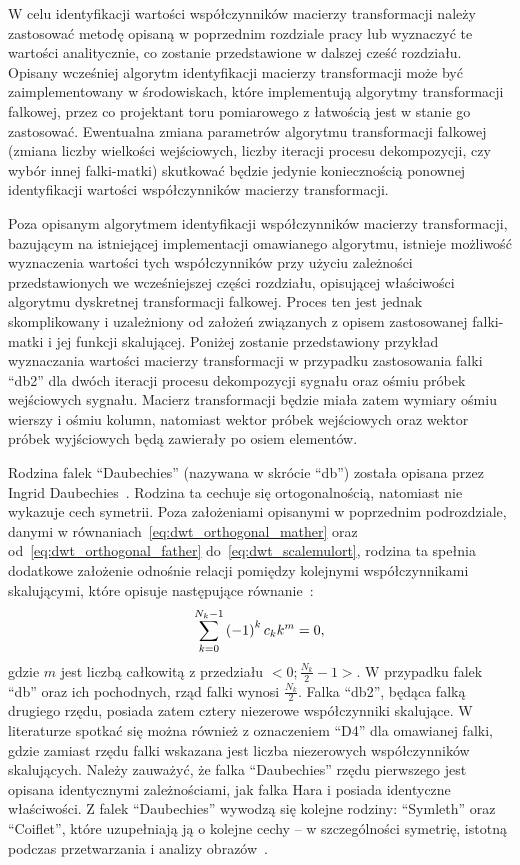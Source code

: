 W celu identyfikacji wartości współczynników macierzy transformacji należy zastosować metodę opisaną w poprzednim rozdziale pracy lub wyznaczyć te wartości analitycznie, co zostanie przedstawione w dalszej cześć rozdziału. Opisany wcześniej algorytm identyfikacji macierzy transformacji może być zaimplementowany w środowiskach, które implementują algorytmy transformacji falkowej, przez co projektant toru pomiarowego z łatwością jest w stanie go zastosować. Ewentualna zmiana parametrów algorytmu transformacji falkowej (zmiana liczby wielkości wejściowych, liczby iteracji procesu dekompozycji, czy wybór innej falki-matki) skutkować będzie jedynie koniecznością ponownej identyfikacji wartości współczynników macierzy transformacji.

Poza opisanym algorytmem identyfikacji współczynników macierzy transformacji, bazującym na istniejącej implementacji omawianego algorytmu, istnieje możliwość wyznaczenia wartości tych współczynników przy użyciu zależności przedstawionych we wcześniejszej części rozdziału, opisującej właściwości algorytmu dyskretnej transformacji falkowej. Proces ten jest jednak skomplikowany i uzależniony od założeń związanych z opisem zastosowanej falki-matki i jej funkcji skalującej. Poniżej zostanie przedstawiony przykład wyznaczania wartości macierzy transformacji w przypadku zastosowania falki \enquote{db2} dla dwóch iteracji procesu dekompozycji sygnału oraz ośmiu próbek wejściowych sygnału. Macierz transformacji będzie miała zatem wymiary ośmiu wierszy i ośmiu kolumn, natomiast wektor próbek wejściowych oraz wektor próbek wyjściowych będą zawierały po osiem elementów.

Rodzina falek \enquote{Daubechies} (nazywana w skrócie \enquote{db}) została opisana przez Ingrid Daubechies~\cite{vonesch_dbbasics}. Rodzina ta cechuje się ortogonalnością, natomiast nie wykazuje cech symetrii. Poza założeniami opisanymi w poprzednim podrozdziale, danymi w równaniach~\eqref{eq:dwt_orthogonal_mather} oraz od~\eqref{eq:dwt_orthogonal_father} do~\eqref{eq:dwt_scalemulort}, rodzina ta spełnia dodatkowe założenie odnośnie relacji pomiędzy kolejnymi współczynnikami skalującymi, które opisuje następujące równanie~\cite{vonesch_dbbasics}:
\begin{equation}
\sum _{k=0} ^{N_k-1} \left(-1\right)^{k} c_{k} k^{m} = 0 \label{eq:db_musthave},
\end{equation}
gdzie $m$ jest liczbą całkowitą z przedziału $<0;\frac{N_{k}}{2}-1>$. W przypadku falek \enquote{db} oraz ich pochodnych, rząd falki wynosi $\frac{N_{k}}{2}$. Falka \enquote{db2}, będąca falką drugiego rzędu, posiada zatem cztery niezerowe współczynniki skalujące. W literaturze spotkać się można również z oznaczeniem \enquote{D4} dla omawianej falki, gdzie zamiast rzędu falki wskazana jest liczba niezerowych współczynników skalujących. Należy zauważyć, że falka \enquote{Daubechies} rzędu pierwszego jest opisana identycznymi zależnościami, jak falka Hara i posiada identyczne właściwości. Z falek \enquote{Daubechies} wywodzą się kolejne rodziny: \enquote{Symleth} oraz \enquote{Coiflet}, które uzupełniają ją o kolejne cechy -- w szczególności symetrię, istotną podczas przetwarzania i analizy obrazów~\cite{wallen_handbook, akujuobi_applications}.

